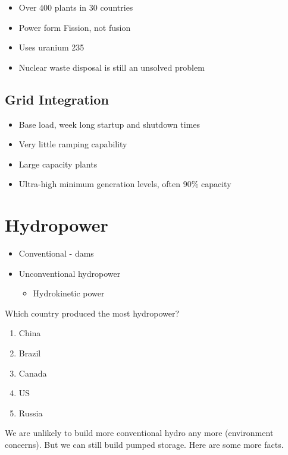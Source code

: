 \documentclass[12pt, a4paper]{report}
\begin{document}
  \begin{itemize}
    \item Over 400 plants in 30 countries
    \item Power form Fission, not fusion
    \item Uses uranium 235
    \item Nuclear waste disposal is still an unsolved problem
  \end{itemize}

  \subsection{Grid Integration}

  \begin{itemize}
    \item Base load, week long startup and shutdown times
    \item Very little ramping capability
    \item Large capacity plants
    \item Ultra-high minimum generation levels, often 90\% capacity
  \end{itemize}

  \section{Hydropower}

  \begin{itemize}
    \item Conventional - dams
    \item Unconventional hydropower
      \begin{itemize}
        \item Hydrokinetic power
      \end{itemize}
  \end{itemize}

  Which country produced the most hydropower?

  \begin{enumerate}
    \item China
    \item Brazil
    \item Canada
    \item US
    \item Russia
  \end{enumerate}


  We are unlikely to build more conventional hydro any more (environment concerns). But we can still build pumped storage. Here are some more facts.
\end{document}
